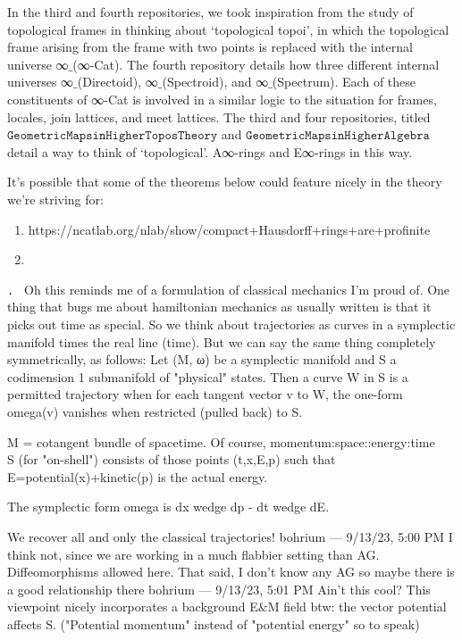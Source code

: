 \documentclass{book}
\newcounter{pcounter}
\newcounter{sectioncount}
\newcounter{subsectioncount}
\renewcommand{\subsection}[1]{\texttt{\thesubsectioncount . #1} \stepcounter{subsectioncount}}
\begin{document}
In the third and fourth repositories, we took inspiration from the study of topological frames in thinking about `topological topoi', in which the topological frame arising from the frame with two points is replaced with the internal universe ∞$\_$(∞-Cat). The fourth repository details how three different internal universes ∞$\_$(Directoid), ∞$\_$(Spectroid), and ∞$\_$(Spectrum). Each of these constituents of ∞-Cat is involved in a similar logic to the situation for frames, locales, join lattices, and meet lattices. The third and four repositories, titled $\texttt{GeometricMapsinHigherToposTheory}$ and $\texttt{GeometricMapsinHigherAlgebra}$ detail a way to think of `topological'. A∞-rings and E∞-rings in this way.

It's possible that some of the theorems below could feature nicely in the theory we're striving for:

\begin{enumerate}
\item https://ncatlab.org/nlab/show/compact+Hausdorff+rings+are+profinite
\item 
\end{enumerate}

\iffalse
\subsection{}
Oh this reminds me of a formulation of classical mechanics I'm proud of. One thing that bugs me about hamiltonian mechanics as usually written is that it picks out time as special. So we think about trajectories as curves in a symplectic manifold times the real line (time). But we can say the same thing completely symmetrically, as follows:
Let (M, ω) be a symplectic manifold and S a codimension 1 submanifold of "physical" states.  Then a curve W in S is a permitted trajectory when for each tangent vector v to W, the one-form omega(v) vanishes when restricted (pulled back) to S.

M = cotangent bundle of spacetime.  Of course, momentum:space::energy:time\\

S (for "on-shell") consists of those points (t,x,E,p) such that E=potential(x)+kinetic(p) is the actual energy.

The symplectic form omega is dx wedge dp - dt wedge dE.

We recover all and only the classical trajectories!
bohrium — 9/13/23, 5:00 PM
I think not, since we are working in a much flabbier setting than AG.  Diffeomorphisms allowed here.
That said, I don't know any AG so maybe there is a good relationship there
bohrium — 9/13/23, 5:01 PM
Ain't this cool?
This viewpoint nicely incorporates a background E&M field btw: the vector potential affects S.
("Potential momentum" instead of "potential energy" so to speak)
\end{document}
